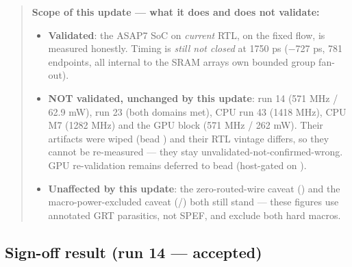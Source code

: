 \begin{record}
\begin{quote}
\textbf{Scope of this update --- what it does and does not validate:}

\begin{itemize}
\tightlist
\item
  \textbf{Validated}: the ASAP7 SoC on \emph{current} RTL, on the fixed
  flow, is measured honestly. Timing is \emph{still not closed} at 1750
  ps (−727 ps, 781 endpoints, all internal to the SRAM
  array\textquotesingle s own bounded group fan-out).
\item
  \textbf{NOT validated, unchanged by this update}: run 14 (571 MHz /
  62.9 mW), run 23 (both domains met), CPU run 43 (1418 MHz), CPU M7
  (1282 MHz) and the GPU block (571 MHz / 262 mW). Their artifacts were
  wiped (bead ) and their RTL vintage differs, so they cannot
  be re-measured --- they stay unvalidated-not-confirmed-wrong. GPU
  re-validation remains deferred to bead 
  (host-gated on ).
\item
  \textbf{Unaffected by this update}: the zero-routed-wire caveat
  () and the macro-power-excluded caveat
  (/) both still stand --- these figures use
  annotated GRT parasitics, not SPEF, and exclude both hard macros.
\end{itemize}
\end{quote}

\end{record}

\subsection{Sign-off result (run 14 --- accepted)}\label{cr:run:phase5:sign-off-result-run-14-accepted}

